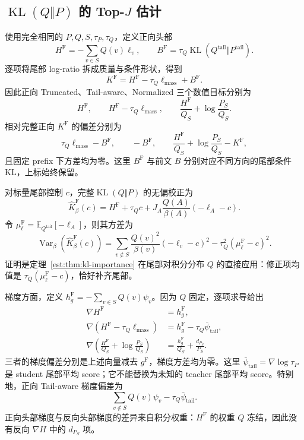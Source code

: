 \documentclass[lang=cn,scheme=chinese,openany]{../book/elegantbook}
\newcommand{\E}{\mathbb E}
\newcommand{\KL}{\operatorname{KL}}
\newcommand{\Var}{\operatorname{Var}}
\newcommand{\tail}{\mathrm{tail}}
\begin{document}
\subsection{$\KL(Q\Vert P)$ 的 Top-$J$ 估计}

使用完全相同的 $P,Q,S,\tau_P,\tau_Q$，定义正向头部
\begin{equation*}
 H^{\mathrm F}=-\sum_{v\in S}Q(v)\ell_v,\qquad
 B^{\mathrm F}=\tau_Q\KL(Q^{\tail}\Vert P^{\tail}).
\end{equation*}
逐项将尾部 log-ratio 拆成质量与条件形状，得到
\begin{equation*}
 K^{\mathrm F}=H^{\mathrm F}-\tau_Q\ell_{\mathrm{mass}}+B^{\mathrm F}.
\end{equation*}
因此正向 Truncated、Tail-aware、Normalized 三个数值目标分别为
\begin{equation*}
 H^{\mathrm F},\qquad
 H^{\mathrm F}-\tau_Q\ell_{\mathrm{mass}},\qquad
 \frac{H^{\mathrm F}}{Q_S}+\log\frac{P_S}{Q_S}.
\end{equation*}
相对完整正向 $K^{\mathrm F}$ 的偏差分别为
\begin{equation*}
 \tau_Q\ell_{\mathrm{mass}}-B^{\mathrm F},\qquad
 -B^{\mathrm F},\qquad
 \frac{H^{\mathrm F}}{Q_S}+\log\frac{P_S}{Q_S}-K^{\mathrm F},
\end{equation*}
且固定 prefix 下方差均为零。这里 $B^{\mathrm F}$ 与前文 $B$ 分别对应不同方向的尾部条件 KL，上标始终保留。

对标量尾部控制 $c$，完整$\KL(Q\Vert P)$ 的无偏校正为
\begin{equation*}
 \widehat K^{\mathrm F}_\beta(c)
 =H^{\mathrm F}+\tau_Qc
   +J_A\frac{Q(A)}{\beta(A)}(-\ell_A-c).
\end{equation*}
令 $\mu_\ell^{\mathrm F}=\E_{Q^{\tail}}[-\ell_A]$，则其方差为
\begin{equation*}
 \Var_\beta(\widehat K^{\mathrm F}_\beta(c))
 =\sum_{v\notin S}\frac{Q(v)^2}{\beta(v)}(-\ell_v-c)^2
   -\tau_Q^2(\mu_\ell^{\mathrm F}-c)^2.
\end{equation*}
证明是定理~\ref{est:thm:kl-importance} 在尾部对积分分布 $Q$ 的直接应用：修正项均值是 $\tau_Q(\mu_\ell^{\mathrm F}-c)$，恰好补齐尾部。

梯度方面，定义 $h_g^{\mathrm F}=-\sum_{v\in S}Q(v)\psi_v$。因为 $Q$ 固定，逐项求导给出
\begin{align*}
 \nabla H^{\mathrm F}&=h_g^{\mathrm F},\\
 \nabla(H^{\mathrm F}-\tau_Q\ell_{\mathrm{mass}})
 &=h_g^{\mathrm F}-\tau_Q\bar\psi_{\tail},\\
 \nabla\left(\frac{H^{\mathrm F}}{Q_S}+\log\frac{P_S}{Q_S}\right)
 &=\frac{h_g^{\mathrm F}}{Q_S}+\frac{d_{P_S}}{P_S}.
\end{align*}
三者的梯度偏差分别是上述向量减去 $g^{\mathrm F}$，梯度方差均为零。这里 $\bar\psi_{\tail}=\nabla\log\tau_P$ 是 student 尾部平均 score；它不能替换为未知的 teacher 尾部平均 score。特别地，正向 Tail-aware 梯度偏差为
\begin{equation*}
 \sum_{v\notin S}Q(v)\psi_v-\tau_Q\bar\psi_{\tail}.
\end{equation*}
正向头部梯度与反向头部梯度的差异来自积分权重：$H^{\mathrm F}$ 的权重 $Q$ 冻结，因此没有反向 $\nabla H$ 中的 $d_{P_S}$ 项。
\end{document}
